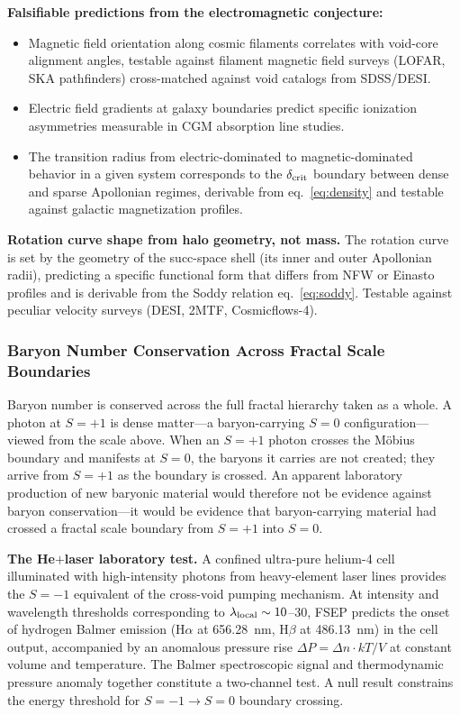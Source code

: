 \documentclass[11pt,letterpaper]{article}
\begin{document}
\textbf{Falsifiable predictions from the electromagnetic conjecture:}
\begin{itemize}
\item Magnetic field orientation along cosmic filaments correlates with void-core
    alignment angles, testable against filament magnetic field surveys (LOFAR, SKA
    pathfinders) cross-matched against void catalogs from SDSS/DESI.
\item Electric field gradients at galaxy boundaries predict specific ionization
    asymmetries measurable in CGM absorption line studies.
\item The transition radius from electric-dominated to magnetic-dominated behavior
    in a given system corresponds to the $\delta_{\rm crit}$ boundary between dense
    and sparse Apollonian regimes, derivable from eq.~\eqref{eq:density} and
    testable against galactic magnetization profiles.
\end{itemize}

\textbf{Rotation curve shape from halo geometry, not mass.} The rotation curve is
set by the geometry of the succ-space shell (its inner and outer Apollonian radii),
predicting a specific functional form that differs from NFW or Einasto profiles and
is derivable from the Soddy relation eq.~\eqref{eq:soddy}. Testable against
peculiar velocity surveys (DESI, 2MTF, Cosmicflows-4).

\subsubsection{Baryon Number Conservation Across Fractal Scale Boundaries}
\label{sec:baryon}
Baryon number is conserved across the full fractal hierarchy taken as a whole. A
photon at $S{=}+1$ is dense matter---a baryon-carrying $S{=}0$ configuration---viewed
from the scale above. When an $S{=}+1$ photon crosses the M\"obius boundary and
manifests at $S{=}0$, the baryons it carries are not created; they arrive from
$S{=}+1$ as the boundary is crossed. An apparent laboratory production of new
baryonic material would therefore not be evidence against baryon conservation---it
would be evidence that baryon-carrying material had crossed a fractal scale boundary
from $S{=}+1$ into $S{=}0$.

\textbf{The He$+$laser laboratory test.} A confined ultra-pure helium-4 cell
illuminated with high-intensity photons from heavy-element laser lines provides the
$S{=}{-1}$ equivalent of the cross-void pumping mechanism. At intensity and
wavelength thresholds corresponding to $\lambda_{\rm local}\sim 10$--$30$, FSEP
predicts the onset of hydrogen Balmer emission (H$\alpha$ at 656.28~nm, H$\beta$ at
486.13~nm) in the cell output, accompanied by an anomalous pressure rise $\Delta P=
\Delta n\cdot kT/V$ at constant volume and temperature. The Balmer spectroscopic
signal and thermodynamic pressure anomaly together constitute a two-channel test. A
null result constrains the energy threshold for $S{=}{-1}\to S{=}0$ boundary
crossing.
\end{document}
